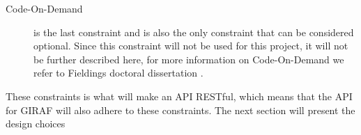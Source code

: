 \begin{description}
\begin{itemize}
    \end{itemize} 
    \item [Code-On-Demand] is the last constraint and is also the only constraint that can be considered optional.
    Since this constraint will not be used for this project, it will not be further described here, for more information on Code-On-Demand we refer to Fieldings doctoral dissertation \citep{fielding2000rest}.
\end{description}

These constraints is what will make an API RESTful, which means that the API for GIRAF will also adhere to these constraints.
The next section will present the design choices 